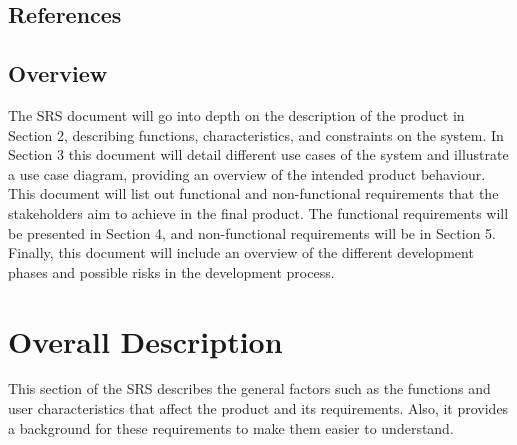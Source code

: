 \documentclass[]{article}
\begin{document}
\subsection{References}
\label{sub:references}



\subsection{Overview}
\label{sub:overview}
The SRS document will go into depth on the description of the product in Section 2, describing functions, characteristics, and constraints on the system. In Section 3 this document will detail different use cases of the system and illustrate a use case diagram, providing an overview of the intended product behaviour. This document will list out functional and non-functional requirements that the stakeholders aim to achieve in the final product. The functional requirements will be presented in Section 4, and non-functional requirements will be in Section 5. Finally, this document will include an overview of the different development phases and possible risks in the development process.

\section{Overall Description}
\label{sec:overall_description}

This section of the SRS describes the general factors such as the functions and user characteristics that affect the product and its requirements. Also, it provides a background for these requirements to make them easier to understand.

\end{document}
